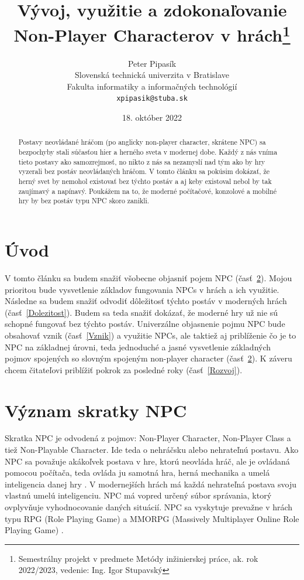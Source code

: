 \documentclass[10pt,twoside,slovak,a4paper]{article}
\title{Vývoj, využitie a zdokonaľovanie Non-Player Characterov v hrách\thanks{Semestrálny projekt v predmete Metódy inžinierskej práce, ak. rok 2022/2023, vedenie: Ing. Igor Stupavský}}
\author{Peter Pipasík\\[2pt]
	{\small Slovenská technická univerzita v Bratislave}\\
	{\small Fakulta informatiky a informačných technológií}\\
	{\small \texttt{xpipasik@stuba.sk}}
	}
\date{\small 18. október 2022}
\begin{document}
\maketitle

\begin{abstract}
Postavy neovládané hráčom (po anglicky non-player character, skrátene NPC) sa bezpochyby stali súčasťou hier a herného sveta v modernej dobe. Každý z nás vníma tieto postavy ako samozrejmosť, no nikto z nás sa nezamyslí nad tým ako by hry vyzerali bez postáv neovládaných hráčom. V tomto článku sa pokúsim dokázať, že herný svet by nemohol existovať
bez týchto postáv a aj keby existoval nebol by tak zaujímavý a napínavý. Poukážem na to, že moderné počítačové, konzolové a mobilné hry by bez postáv typu NPC skoro zanikli.
   

\end{abstract}

\section{Úvod}
V tomto článku sa budem snažiť všobecne objasniť pojem NPC (časť~\ref{Vyznam skratky}). Mojou prioritou bude vysvetlenie základov fungovania NPCs v hrách a ich využitie. Následne sa budem snažiť odvodiť dôležitosť týchto postáv v moderných hrách (časť~\ref{Dolezitost}). Budem sa teda snažiť dokázať, že moderné hry už nie sú schopné fungovať bez týchto postáv.
Univerzálne objasnenie pojmu NPC bude obsahovať vznik (časť~\ref{Vznik}) a využitie NPCs, ale taktiež aj priblíženie čo je to NPC na základnej úrovni, teda jednoduché a jasné vysvetlenie základných pojmov spojených so slovným spojeným non-player character (časť~\ref{Vyznam skratky}).
K záveru chcem čitateľovi priblížiť pokrok za posledné roky (časť~\ref{Rozvoj}). 


\section{Význam skratky NPC}  \label{Vyznam skratky}
Skratka NPC je odvodená z pojmov: Non-Player Character, Non-Player Class a tiež Non-Playable Character. Ide teda o nehráčsku alebo nehrateľnú postavu. Ako NPC sa považuje akákoľvek postava v hre, ktorú neovláda hráč, ale je ovládaná pomocou počítača, teda ovláda ju samotná hra, herná mechanika a umelá inteligencia danej hry \cite{Hack2018}. V modernejších hrách má každá nehrateľná postava svoju vlastnú umelú inteligenciu. NPC má vopred určený súbor správania, ktorý ovplyvňuje vyhodnocovanie daných situácií. NPC sa vyskytuje prevažne v hrách typu RPG (Role Playing Game) a MMORPG (Massively Multiplayer Online Role Playing Game) \cite{9291553}.
\end{document}
